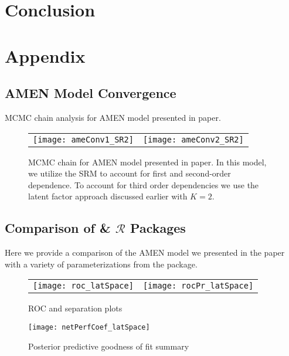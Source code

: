\section{\textbf{Conclusion}}



\newpage
\section{\textbf{Appendix}}

\subsection{AMEN Model Convergence}

MCMC chain analysis for AMEN model presented in paper.  

\begin{figure}[ht]
	\centering
	\begin{tabular}{cc}
	\texttt{[image: ameConv1\_SR2]} &
	\texttt{[image: ameConv2\_SR2]}
	\end{tabular}
	\caption{MCMC chain for AMEN model presented in paper. In this model, we utilize the SRM to account for first and second-order dependence. To account for third order dependencies we use the latent factor approach discussed earlier with $K=2$.}
	\label{fig:ameConv}
\end{figure}
\FloatBarrier
\newpage

\subsection{Comparison of  \&  $\mathcal{R}$ Packages}

Here we provide a comparison of the AMEN model we presented in the paper with a variety of parameterizations from the  package. 



\begin{figure}[ht]
	\centering
	\begin{tabular}{cc}
	\texttt{[image: roc\_latSpace]} & 
	\texttt{[image: rocPr\_latSpace]}
	\end{tabular}
	\caption{ROC and separation plots}
	\label{fig:roc_latentSpace}
\end{figure}

\begin{figure}[ht]
	\centering
	\texttt{[image: netPerfCoef\_latSpace]}
	\caption{Posterior predictive goodness of fit summary}
	\label{fig:netPerfCoef_latSpace}
\end{figure}

